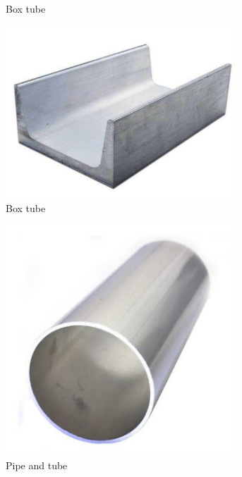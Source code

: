 \begin{figure}[H]
\begin{subfigure}[b]{.19\linewidth}
		\caption{Box tube}
	\end{subfigure} \begin{subfigure}[b]{.19\linewidth}
		\includegraphics[width=0.95\textwidth]{imgs/extrusion_channel.jpeg}
		\caption{Box tube}
	\end{subfigure} \begin{subfigure}[b]{.19\linewidth}
		\includegraphics[width=0.95\textwidth]{imgs/extrusion_roundtube.jpeg}
		\caption{Pipe and tube}
	\end{subfigure}	\begin{subfigure}[b]{.19\linewidth}

\end{subfigure}
\end{figure}
